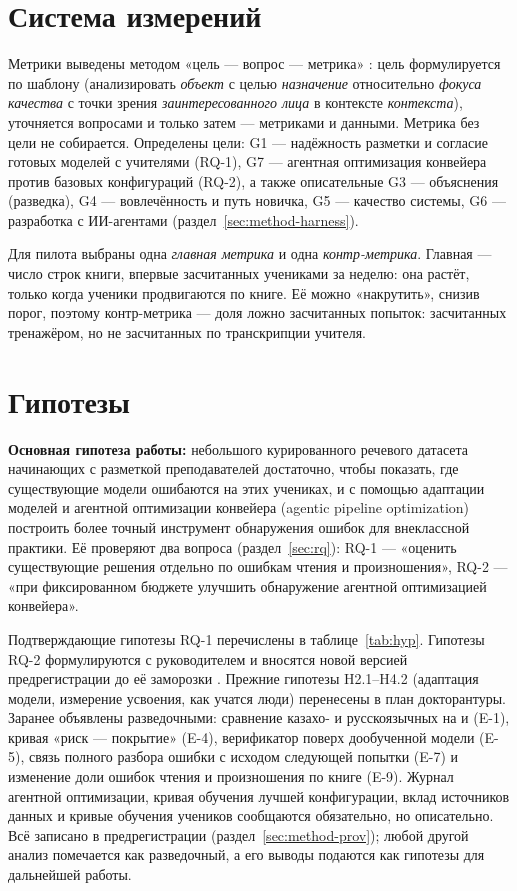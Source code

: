 \section{Система измерений}\label{sec:method-gqm}

Метрики выведены методом «цель --- вопрос --- метрика» \cite{SRC-048}: цель формулируется по шаблону
(анализировать \emph{объект} с целью \emph{назначение} относительно \emph{фокуса качества} с точки зрения
\emph{заинтересованного лица} в контексте \emph{контекста}), уточняется вопросами и только затем ---
метриками и данными. Метрика без цели не собирается. Определены цели: G1 --- надёжность разметки и
согласие готовых моделей с учителями (RQ-1), G7 --- агентная оптимизация конвейера против базовых конфигураций (RQ-2), а также описательные G3 --- объяснения (разведка), G4 --- вовлечённость и путь новичка,
G5 --- качество системы, G6 --- разработка с ИИ-агентами (раздел~\ref{sec:method-harness}).

Для пилота выбраны одна \emph{главная метрика} и одна \emph{контр-метрика}. Главная --- число строк книги,
впервые засчитанных учениками за неделю: она растёт, только когда ученики продвигаются по книге. Её можно
«накрутить», снизив порог, поэтому контр-метрика --- доля ложно засчитанных попыток: засчитанных
тренажёром, но не засчитанных по транскрипции учителя.

\section{Гипотезы}\label{sec:method-hyp}

\textbf{Основная гипотеза работы:} небольшого курированного речевого датасета начинающих с разметкой преподавателей достаточно, чтобы показать, где существующие модели ошибаются на этих учениках, и с помощью адаптации моделей и агентной оптимизации конвейера (agentic pipeline optimization) построить более точный инструмент обнаружения ошибок для внеклассной практики. Её проверяют два вопроса (раздел~\ref{sec:rq}): RQ-1 --- «оценить существующие решения отдельно по ошибкам чтения и произношения», RQ-2 --- «при фиксированном бюджете улучшить обнаружение агентной оптимизацией конвейера».

Подтверждающие гипотезы RQ-1 перечислены в таблице~\ref{tab:hyp}. Гипотезы RQ-2 формулируются с руководителем и вносятся новой версией предрегистрации до её заморозки . Прежние гипотезы H2.1--H4.2 (адаптация модели, измерение усвоения, как учатся люди) перенесены в план докторантуры. Заранее объявлены разведочными: сравнение
казахо- и русскоязычных на  и  (E-1), кривая «риск --- покрытие» (E-4), верификатор поверх
дообученной модели (E-5), связь полного разбора ошибки с исходом следующей попытки (E-7) и изменение доли ошибок чтения и произношения по книге (E-9).
Журнал агентной оптимизации, кривая обучения лучшей конфигурации, вклад источников данных и кривые обучения учеников
сообщаются обязательно, но описательно. Всё записано в предрегистрации (раздел~\ref{sec:method-prov}); любой
другой анализ помечается как разведочный, а его выводы подаются как гипотезы для дальнейшей работы.

